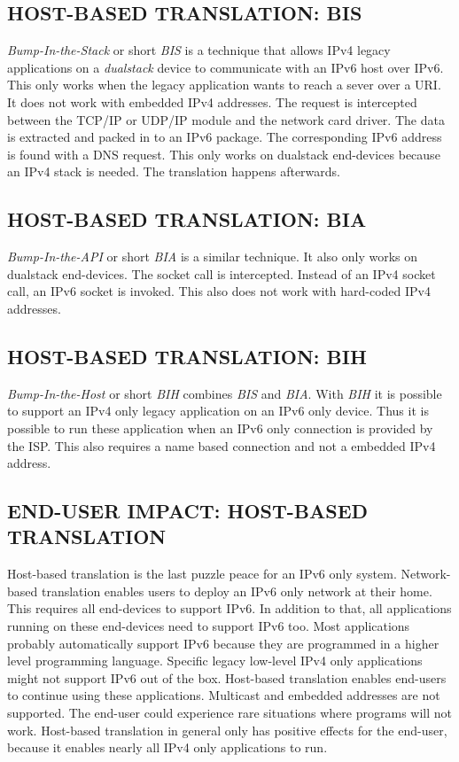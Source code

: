 \documentclass[format=sigconf, natbib=true, nonacm=true]{acmart}
\begin{document}
    \subsection{HOST-BASED TRANSLATION: BIS}
    \textit{Bump-In-the-Stack} or short \textit{BIS} is a technique that allows IPv4 legacy applications on a \textit{dualstack} device to communicate with an IPv6 host over IPv6. This only works when the legacy application wants to reach a sever over a URI. It does not work with embedded IPv4 addresses. The request is intercepted between the TCP/IP or UDP/IP module and the network card driver. The data is extracted and packed in to an IPv6 package. The corresponding IPv6 address is found with a DNS request. This only works on dualstack end-devices because an IPv4 stack is needed. The translation happens afterwards\cite{8716482}.
    \subsection{HOST-BASED TRANSLATION: BIA}
    \textit{Bump-In-the-API} or short \textit{BIA} is a similar technique. It also only works on dualstack end-devices. The socket call is intercepted. Instead of an IPv4 socket call, an IPv6 socket is invoked. This also does not work with hard-coded IPv4 addresses\cite{8716482}.
    \subsection{HOST-BASED TRANSLATION: BIH}
    \textit{Bump-In-the-Host} or short \textit{BIH} combines \textit{BIS} and \textit{BIA}. With \textit{BIH} it is possible to support an IPv4 only legacy application on an IPv6 only device. Thus it is possible to run these application when an IPv6 only connection is provided by the ISP. This also requires a name based connection and not a embedded IPv4 address\cite{8716482}. 
    \subsection*{END-USER IMPACT: HOST-BASED TRANSLATION}
    Host-based translation is the last puzzle peace for an IPv6 only system. Network-based translation enables users to deploy an IPv6 only network at their home. This requires all end-devices to support IPv6. In addition to that, all applications running on these end-devices need to support IPv6 too. Most applications probably automatically support IPv6 because they are programmed in a higher level programming language. Specific legacy low-level IPv4 only applications might not support IPv6 out of the box. Host-based translation enables end-users to continue using these applications. Multicast and embedded addresses are not supported. The end-user could experience rare situations where programs will not work. Host-based translation in general only has positive effects for the end-user, because it enables nearly all IPv4 only applications to run.
\end{document}

